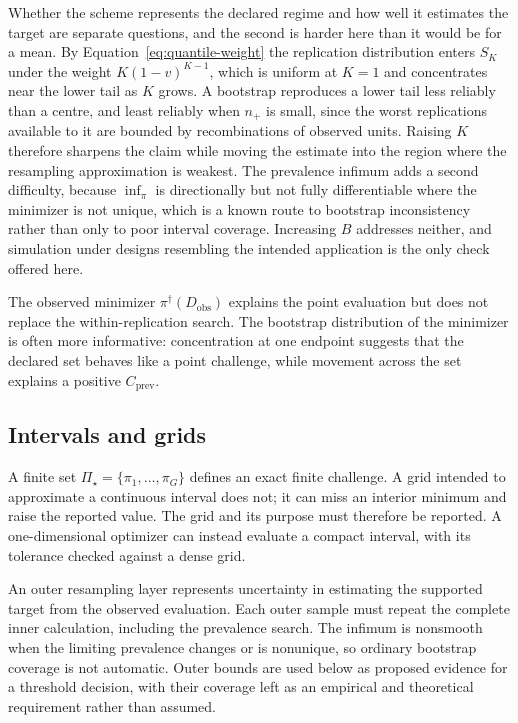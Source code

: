\documentclass[11pt]{article}
\newcommand{\PSet}{\Pi_\star}
\theoremstyle{remark}
\begin{document}
Whether the scheme represents the declared regime and how well it estimates the target are separate questions, and the second is harder here than it would be for a mean. By Equation~\eqref{eq:quantile-weight} the replication distribution enters $S_K$ under the weight $K(1-v)^{K-1}$, which is uniform at $K=1$ and concentrates near the lower tail as $K$ grows. A bootstrap reproduces a lower tail less reliably than a centre, and least reliably when $n_+$ is small, since the worst replications available to it are bounded by recombinations of observed units. Raising $K$ therefore sharpens the claim while moving the estimate into the region where the resampling approximation is weakest. The prevalence infimum adds a second difficulty, because $\inf_\pi$ is directionally but not fully differentiable where the minimizer is not unique, which is a known route to bootstrap inconsistency rather than only to poor interval coverage. Increasing $B$ addresses neither, and simulation under designs resembling the intended application is the only check offered here.

The observed minimizer $\pi^\dagger(D_{\mathrm{obs}})$ explains the point evaluation but does not replace the within-replication search. The bootstrap distribution of the minimizer is often more informative: concentration at one endpoint suggests that the declared set behaves like a point challenge, while movement across the set explains a positive $C_{\mathrm{prev}}$.

\subsection{Intervals and grids}

A finite set $\PSet=\{\pi_1,\ldots,\pi_G\}$ defines an exact finite challenge. A grid intended to approximate a continuous interval does not; it can miss an interior minimum and raise the reported value. The grid and its purpose must therefore be reported. A one-dimensional optimizer can instead evaluate a compact interval, with its tolerance checked against a dense grid.

An outer resampling layer represents uncertainty in estimating the supported target from the observed evaluation. Each outer sample must repeat the complete inner calculation, including the prevalence search. The infimum is nonsmooth when the limiting prevalence changes or is nonunique, so ordinary bootstrap coverage is not automatic. Outer bounds are used below as proposed evidence for a threshold decision, with their coverage left as an empirical and theoretical requirement rather than assumed.
\end{document}
